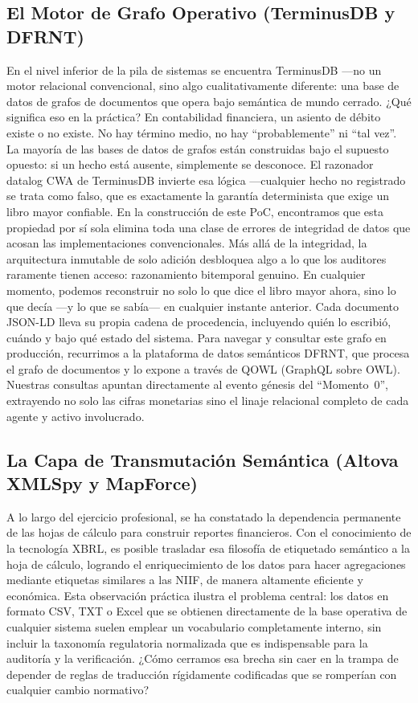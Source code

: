 \documentclass[12pt, a4paper]{article}
\begin{document}
\subsection{El Motor de Grafo Operativo (TerminusDB y DFRNT)}
En el nivel inferior de la pila de sistemas se encuentra TerminusDB ---no un motor relacional convencional, sino algo cualitativamente diferente: una base de datos de grafos de documentos que opera bajo semántica de mundo cerrado. ¿Qué significa eso en la práctica? En contabilidad financiera, un asiento de débito existe o no existe. No hay término medio, no hay ``probablemente'' ni ``tal vez''. La mayoría de las bases de datos de grafos están construidas bajo el supuesto opuesto: si un hecho está ausente, simplemente se desconoce. El razonador datalog CWA de TerminusDB invierte esa lógica ---cualquier hecho no registrado se trata como falso, que es exactamente la garantía determinista que exige un libro mayor confiable. En la construcción de este PoC, encontramos que esta propiedad por sí sola elimina toda una clase de errores de integridad de datos que acosan las implementaciones convencionales. Más allá de la integridad, la arquitectura inmutable de solo adición desbloquea algo a lo que los auditores raramente tienen acceso: razonamiento bitemporal genuino. En cualquier momento, podemos reconstruir no solo lo que dice el libro mayor ahora, sino lo que decía ---y lo que se sabía--- en cualquier instante anterior. Cada documento JSON-LD lleva su propia cadena de procedencia, incluyendo quién lo escribió, cuándo y bajo qué estado del sistema. Para navegar y consultar este grafo en producción, recurrimos a la plataforma de datos semánticos DFRNT, que procesa el grafo de documentos y lo expone a través de QOWL (GraphQL sobre OWL). Nuestras consultas apuntan directamente al evento génesis del ``Momento~0'', extrayendo no solo las cifras monetarias sino el linaje relacional completo de cada agente y activo involucrado.

\subsection{La Capa de Transmutación Semántica (Altova XMLSpy y MapForce)}
A lo largo del ejercicio profesional, se ha constatado la dependencia permanente de las hojas de cálculo para construir reportes financieros. Con el conocimiento de la tecnología XBRL, es posible trasladar esa filosofía de etiquetado semántico a la hoja de cálculo, logrando el enriquecimiento de los datos para hacer agregaciones mediante etiquetas similares a las NIIF, de manera altamente eficiente y económica. Esta observación práctica ilustra el problema central: los datos en formato CSV, TXT o Excel que se obtienen directamente de la base operativa de cualquier sistema suelen emplear un vocabulario completamente interno, sin incluir la taxonomía regulatoria normalizada que es indispensable para la auditoría y la verificación. ¿Cómo cerramos esa brecha sin caer en la trampa de depender de reglas de traducción rígidamente codificadas que se romperían con cualquier cambio normativo?
\end{document}
